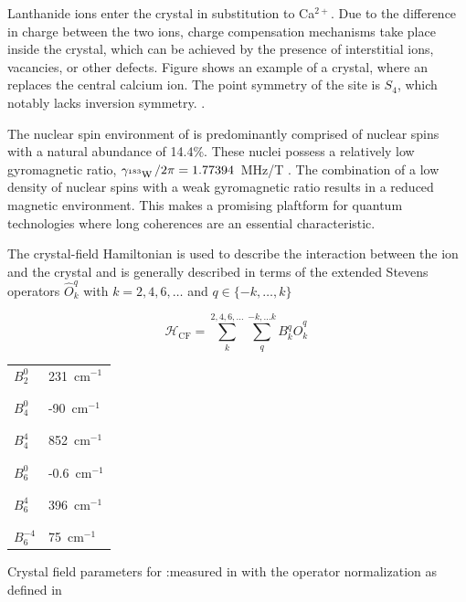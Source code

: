 Lanthanide ions enter the crystal in substitution to Ca$^{2+}$. Due to the difference in charge between the two ions, charge compensation mechanisms take place inside the crystal, which can be achieved by the presence of interstitial ions, vacancies, or other defects. Figure  shows an example of a \Ca crystal, where an \Er replaces the central calcium ion. The point symmetry of the \Er site is $S_4$, which notably lacks inversion symmetry. .

The nuclear spin environment of \Ca is predominantly comprised of \W nuclear spins with a natural abundance of 14.4\%. These nuclei possess a relatively low gyromagnetic ratio, $\gamma_{\text{$^{183}$W\,}}/2\pi = 1.77394$~MHz/T . The combination of a low density of nuclear spins with a weak gyromagnetic ratio results in a reduced magnetic environment. This makes \Ca a promising plaftform for quantum technologies where long coherences are an essential characteristic.

The crystal-field Hamiltonian is used to describe the interaction between the ion and the crystal and is generally described in terms of the extended Stevens operators $\hat{O}^q_k$ with $k=2,4,6,\dots$ and $q \in \{-k,\dots, k\}$ 

\begin{equation}
    \mathcal{H}_{\mathrm{CF}} = \sum_{k}^{2,4,6,\dots}\sum_{q}^{-k,...k} B_k^q \hat{O}^q_k \,
\end{equation}

\begin{margintable}
\centering
\begin{tabular}{l|l}
$B_2^0$    & 231~cm$^{-1}$  \\[-1em] \\ \hline \\[-1em]
$B_4^0$    & -90~cm$^{-1}$  \\[-1em] \\ \hline \\[-1em]
$B_4^4$    & 852~cm$^{-1}$  \\[-1em] \\ \hline \\[-1em]
$B_6^0$    & -0.6~cm$^{-1}$ \\[-1em] \\ \hline \\[-1em]
$B_6^4$    & 396~cm$^{-1}$  \\[-1em] \\ \hline \\[-1em]
$B_6^{-4}$ & 75~cm$^{-1}$  
\end{tabular}
\caption{Crystal field parameters for \Er:\Ca measured in \cite{enrique_optical_1971} with the operator normalization as defined in \cite{erath_crystal_1961}}
\label{tab:cf_parameters}
\end{margintable}

